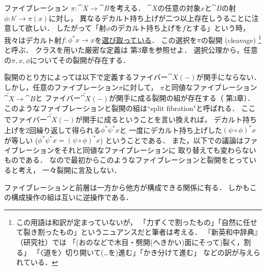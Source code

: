     \begin{Remark}\label{remark:cleavage}
        ファイブレーション $\pi \colon \cat{X} \to \cat{B}$を考える．
        $\cat{X}$の任意の対象$x$と$\cat{B}$の射$\phi \colon b' \to \pi(x)$に対し，
        異なるデカルト持ち上げが二つ以上存在しうることに注意して欲しい．
        したがって「射$\phi$のデカルト持ち上げを$f$とする」という時，
        我々はデカルト射$f \colon \phi^*x \to x$を\underline{選び取っている}．
        この選択を$\pi$の裂開 (cleavage)
        \footnote
        {
            この用語は和訳が定まっていないが，
            「力ずくで割ったもの」「自然に任せて裂き割ったもの」というニュアンスだと筆者は考える．
            『新英和中辞典』（研究社）では
            「(おのなどで木目・劈開(へきかい)面にそって)裂く，割る」
            「〈道を〉切り開いて(…を)進む」「かき分けて進む」
            などの訳が与えられている．
        }
        と呼ぶ．
        クラスを用いた厳密な定義は\cite{FGAexp} 第$3$章を参照せよ．
        選択公理から，任意の$\pi, x, \phi$についてその裂開が存在する．

        裂開のとり方によっては以下で定義するファイバー$\cat{X}(-)$が関手にならない．
        しかし，任意のファイブレーション$\pi$に対して，
        $\pi$と同値なファイブレーション$\tilde{\cat{X}} \to \cat{B}$と
        ファイバー$\tilde{\cat{X}}(-)$が関手に成る裂開の組が存在する（\cite{FGAexp} 第$3$章）．
        このようなファイブレーションと裂開の組は``split fibration"と呼ばれる．
        ここでファイバー$\tilde{\cat{X}}(-)$が関手に成るということを言い換えれば，
        デカルト持ち上げを2回繰り返して得られる$\phi^*\psi^*x$と
        一度にデカルト持ち上げした$(\psi \circ \phi)^*x$が等しい ($\phi^*\psi^*x=(\psi \circ \phi)^*x$)
        ということである．
        また，以下での議論はファイブレーションをそれと同値なファイブレーションに
        取り替えても変わらないものである．
        なので最初からこのようなファイブレーションと裂開をとっていると考え，
        一々裂開に言及しない．
    \end{Remark}

    ファイブレーションと前層は一方から他方が構成できる関係に有る．
    しかもこの構成操作の組は互いに逆操作である．

